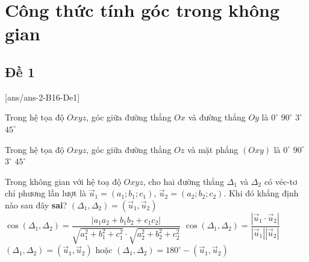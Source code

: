 \section{Công thức tính góc trong không gian}
\subsection{Đề 1}
[ans/ans-2-B16-De1]
\caulc
\begin{ex}%
	Trong hệ tọa độ $Oxyz$, góc giữa đường thẳng $Ox$  và đường thẳng $Oy$ là 
	\choice
	{$0^\circ$}
	{\True $90^\circ$}
	{$3^\circ$}
	{ $45^\circ$}
\end{ex}

\begin{ex}%
	Trong hệ tọa độ $Oxyz$, góc giữa đường thẳng $Oz$  và mặt phẳng $(Oxy)$ là 
	\choice
	{$0^\circ$}
	{\True $90^\circ$}
	{$3^\circ$}
	{ $45^\circ$}
\end{ex}


\begin{ex}%
	Trong không gian với hệ toạ độ $Oxyz$, cho hai đường thẳng $\Delta_1$ và $\Delta_2$ có véc-tơ chỉ phương lần lượt là $\overrightarrow{u}_1=(a_1 ; b_1 ; c_1)$, $\overrightarrow{u}_2=(a_2 ; b_2 ; c_2)$. Khi đó khẳng định nào sau đây \textbf{sai}?
	\choice
	{\True $(\Delta_1,\Delta_2)=(\overrightarrow{u}_1,\overrightarrow{u}_2)$}
	{$\cos \left(\Delta_1, \Delta_2\right)=\dfrac{\left|a_1 a_2+b_1 b_2+c_1 c_2\right|}{\sqrt{a_1^2+b_1^2+c_1^2} \cdot \sqrt{a_2^2+b_2^2+c_2^2}}$}
	{$\cos \left(\Delta_1, \Delta_2\right)=\dfrac{\left|\overrightarrow{u}_1\cdot \overrightarrow{u}_2 \right| }{\left| \overrightarrow{u}_1\right|\left| \overrightarrow{u}_2 \right| }$}
	{$(\Delta_1,\Delta_2)=(\overrightarrow{u}_1,\overrightarrow{u}_2)$ hoặc $(\Delta_1,\Delta_2)=180^\circ-(\overrightarrow{u}_1,\overrightarrow{u}_2)$}
\end{ex}


